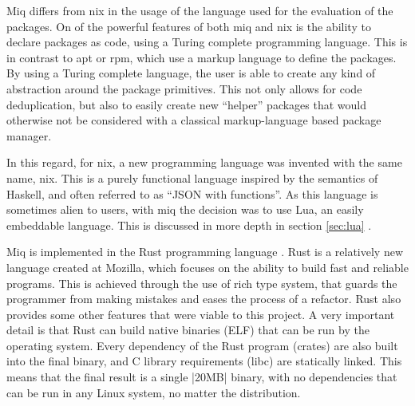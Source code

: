 Miq differs from nix in the usage of the language used for
the evaluation of the packages. On of the powerful features
of both miq and nix is the ability to declare packages as
code, using a Turing complete programming language. This is
in contrast to apt or rpm, which use a markup language to
define the packages. By using a Turing complete language,
the user is able to create any kind of abstraction around
the package primitives. This not only allows for code
deduplication, but also to easily create new ``helper''
packages that would otherwise not be considered with a
classical markup-language based package manager.

In this regard, for nix, a new programming language was
invented with the same name, nix. This is a purely
functional language inspired by the semantics of Haskell, and
often referred to as ``JSON with functions''. As this
language is sometimes alien to users, with miq the decision
was to use Lua, an easily embeddable language. This is
discussed in more depth in section \ref{sec:lua} .

Miq is implemented in the Rust programming language
\cite{RustProgrammingLanguage} . Rust is a relatively new
language created at Mozilla, which focuses on the ability to
build fast and reliable programs. This is achieved through
the use of rich type system, that guards the programmer from
making mistakes and eases the process of a refactor. Rust
also provides some other features that were viable to this
project. A very important detail is that Rust can build
native binaries (ELF) that can be run by the operating
system. Every dependency of the Rust program (crates) are
also built into the final binary, and C library requirements
(libc) are statically linked. This means that the final
result is a single |20MB| binary, with no dependencies that can be
run in any Linux system, no matter the distribution.










